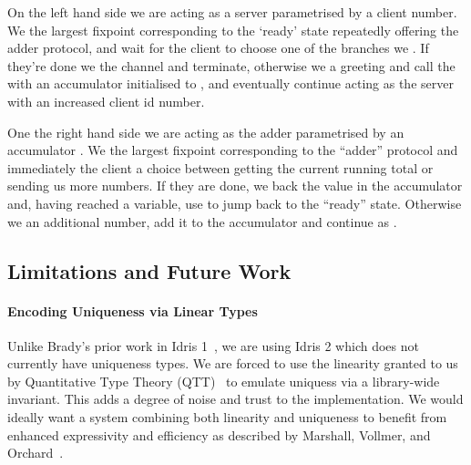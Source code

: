 \documentclass{easychair}
\begin{document}
\noindent\begin{minipage}[t]{.49\textwidth}
\end{minipage}\hfill
\begin{minipage}[t]{.49\textwidth}
\end{minipage}

On the left hand side we are acting as a server parametrised by a client
 number. We  the largest fixpoint
corresponding to the `ready' state repeatedly offering the adder protocol,
and wait for the client to choose one of the branches we .
If they're done we  the channel and terminate,
otherwise we  a greeting and call the
 with an accumulator initialised to ,
and eventually continue acting as the server with an increased client id number.

One the right hand side we are acting as the adder parametrised by an
accumulator . We  the largest
fixpoint corresponding to the ``adder'' protocol and immediately
 the client a choice between getting the current
running total or sending us more numbers.
%
If they are done, we  back the value in the accumulator
and, having reached a  variable, use  to
jump back to the ``ready'' state.
%
Otherwise we  an additional number,
add it to the accumulator and continue as .

\subsection*{Limitations and Future Work}

\paragraph{Encoding Uniqueness via Linear Types}
Unlike Brady's prior work in Idris 1~\cite{DBLP:journals/aghcs/Brady17},
we are using Idris 2 which does not currently have uniqueness types.
We are forced to use the linearity granted to us by
Quantitative Type Theory (QTT)~\cite{DBLP:conf/birthday/McBride16,DBLP:conf/lics/Atkey18}
to emulate uniquess via a library-wide invariant.
%
This adds a degree of noise and trust to the implementation.
We would ideally want a system combining both linearity and uniqueness
to benefit from enhanced expressivity and efficiency as described
by Marshall, Vollmer, and Orchard~\cite{DBLP:conf/esop/MarshallVO22}.
\end{document}
